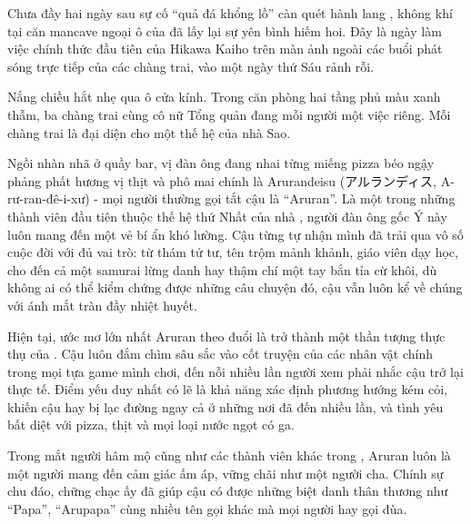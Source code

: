 \documentclass[../main.tex]{subfiles}
\begin{document}

Chưa đầy hai ngày sau sự cố ``quả đá khổng lồ'' càn quét hành lang \hll, không khí tại căn mancave ngoại ô của \hls đã lấy lại sự yên bình hiếm hoi. Đây là ngày làm việc chính thức đầu tiên của Hikawa Kaiho trên màn ảnh ngoài các buổi phát sóng trực tiếp của các chàng trai, vào một ngày thứ Sáu rảnh rỗi.

Nắng chiều hắt nhẹ qua ô cửa kính. Trong căn phòng hai tầng phủ màu xanh thẫm, ba chàng trai cùng cô nữ Tổng quản đang mỗi người một việc riêng. Mỗi chàng trai là đại diện cho một thế hệ của nhà Sao.

\chrint

Ngồi nhàn nhã ở quầy bar, vị đàn ông đang nhai từng miếng pizza béo ngậy phảng phất hương vị thịt và phô mai chính là Arurandeisu (アルランディス, A-rư-ran-đê-i-xư) - mọi người thường gọi tắt cậu là ``Aruran''. Là một trong những thành viên đầu tiên thuộc thế hệ thứ Nhất của nhà \hls, người đàn ông gốc Ý này luôn mang đến một vẻ bí ẩn khó lường. Cậu từng tự nhận mình đã trải qua vô số cuộc đời với đủ vai trò: từ thám tử tư, tên trộm mảnh khảnh, giáo viên dạy học, cho đến cả một samurai lừng danh hay thậm chí một tay bắn tỉa cừ khôi, dù không ai có thể kiểm chứng được những câu chuyện đó, cậu vẫn luôn kể về chúng với ánh mắt tràn đầy nhiệt huyết.

Hiện tại, ước mơ lớn nhất Aruran theo đuổi là trở thành một thần tượng thực thụ của \hls. Cậu luôn đắm chìm sâu sắc vào cốt truyện của các nhân vật chính trong mọi tựa game mình chơi, đến nỗi nhiều lần người xem phải nhắc cậu trở lại thực tế. Điểm yếu duy nhất có lẽ là khả năng xác định phương hướng kém cỏi, khiến cậu hay bị lạc đường ngay cả ở những nơi đã đến nhiều lần, và tình yêu bất diệt với pizza, thịt và mọi loại nước ngọt có ga.

Trong mắt người hâm mộ cũng như các thành viên khác trong \hls, Aruran luôn là một người mang đến cảm giác ấm áp, vững chãi như một người cha. Chính sự chu đáo, chững chạc ấy đã giúp cậu có được những biệt danh thân thương như ``Papa'', ``Arupapa'' cùng nhiều tên gọi khác mà mọi người hay gọi đùa.
\end{document}
